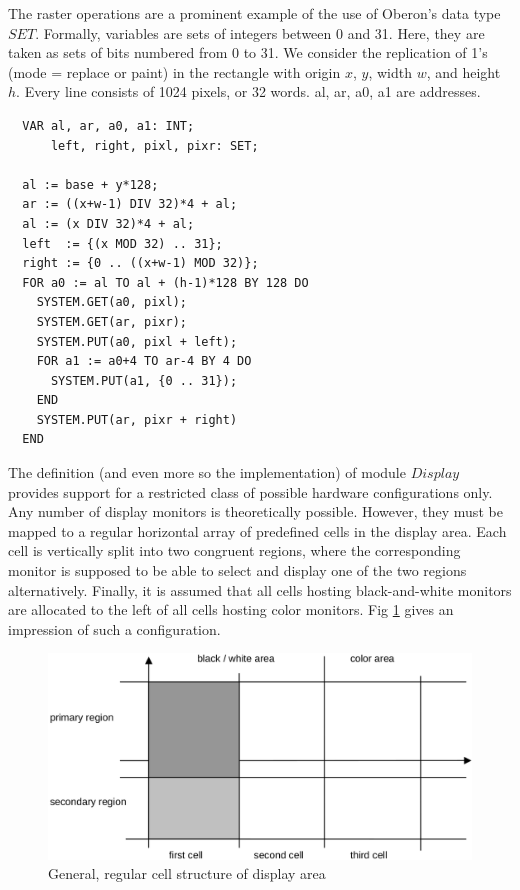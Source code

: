 The raster operations are a prominent example of the use of Oberon's data type $SET$. Formally,
variables are sets of integers between 0 and 31. Here, they are taken as sets of bits numbered
from 0 to 31. We consider the replication of 1's (mode = replace or paint) in the rectangle with
origin $x$, $y$, width $w$, and height $h$. Every line consists of 1024 pixels, or 32 words. al, ar, a0, a1 are addresses.
\begin{verbatim}
  VAR al, ar, a0, a1: INT;
      left, right, pixl, pixr: SET;
  
  al := base + y*128;
  ar := ((x+w-1) DIV 32)*4 + al;
  al := (x DIV 32)*4 + al;
  left  := {(x MOD 32) .. 31};
  right := {0 .. ((x+w-1) MOD 32)};
  FOR a0 := al TO al + (h-1)*128 BY 128 DO
    SYSTEM.GET(a0, pixl);
    SYSTEM.GET(ar, pixr);
    SYSTEM.PUT(a0, pixl + left);
    FOR a1 := a0+4 TO ar-4 BY 4 DO
      SYSTEM.PUT(a1, {0 .. 31});
    END
    SYSTEM.PUT(ar, pixr + right)
  END
\end{verbatim}
The definition (and even more so the implementation) of module $Display$ provides support for a
restricted class of possible hardware configurations only. Any number of display monitors is
theoretically possible. However, they must be mapped to a regular horizontal array of predefined
cells in the display area. Each cell is vertically split into two congruent regions, where the
corresponding monitor is supposed to be able to select and display one of the two regions
alternatively. Finally, it is assumed that all cells hosting black-and-white monitors are allocated to
the left of all cells hosting color monitors. Fig \ref{fig:cell} gives an impression of such a configuration.
\begin{figure}
	\centering
	\includegraphics[width=\textwidth]{i/c}
	\caption{General, regular cell structure of display area}
	\label{fig:cell}
\end{figure}


